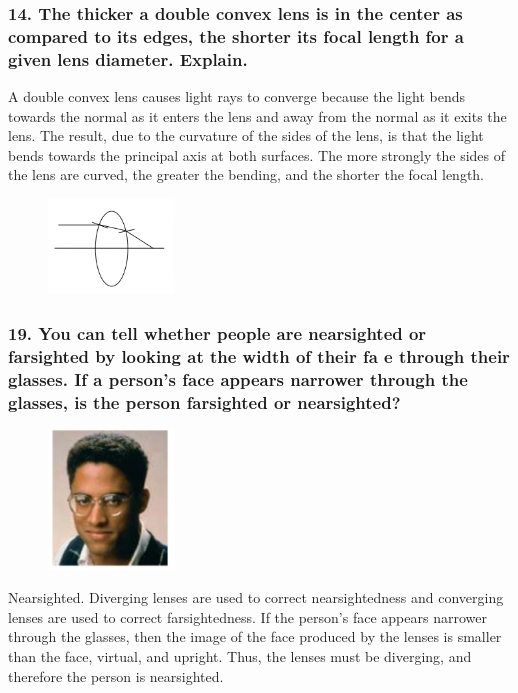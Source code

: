 \documentclass{article}
\begin{document}
\subsubsection*{
    14. The thicker a double convex lens is in the center as compared to its edges,
    the shorter its focal length for a given lens diameter. Explain.
}
A double convex lens causes light rays to converge because the
light bends towards the normal as it enters the lens and away
from the normal as it exits the lens. The result, due to the
curvature of the sides of the lens, is that the light bends towards
the principal axis at both surfaces. The more strongly the sides of
the lens are curved, the greater the bending, and the shorter the
focal length.
\begin{figure}[h]
    \begin{center}
        \includegraphics[width=0.3\textwidth]{figures/q14.png}
    \end{center}
\end{figure}
\subsubsection*{
    19. You can tell whether people are nearsighted or farsighted by looking at the
    width of their fa e through their glasses. If a person’s face appears narrower
    through the glasses, is the person farsighted or nearsighted? 
}
\begin{figure}[h]
    \begin{center}
        \includegraphics[width=0.3\textwidth]{figures/q19.jpg}
    \end{center}
\end{figure}
Nearsighted. Diverging lenses are used to correct nearsightedness and converging lenses are used to
correct farsightedness. If the person’s face appears narrower through the glasses, then the image of
the face produced by the lenses is smaller than the face, virtual, and upright. Thus, the lenses must be
diverging, and therefore the person is nearsighted.
\end{document}
